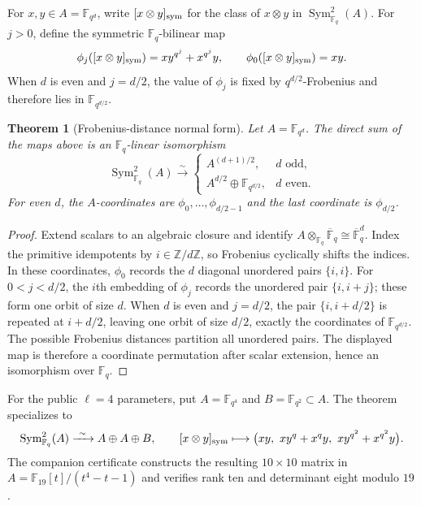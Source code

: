 \documentclass[11pt]{article}
\newtheorem{theorem}{Theorem}
\newcommand{\F}{\mathbb F}
\newcommand{\Sym}{\operatorname{Sym}}
\begin{document}
For $x,y\in A=\F_{q^d}$, write $[x\otimes y]_{\rm sym}$ for the class of
$x\otimes y$ in $\Sym^2_{\F_q}(A)$.  For $j>0$, define the symmetric
$\F_q$-bilinear map
\[
 \phi_j([x\otimes y]_{\rm sym})
 =xy^{q^j}+x^{q^j}y,
 \qquad
 \phi_0([x\otimes y]_{\rm sym})=xy.
\]
When $d$ is even and $j=d/2$, the value of $\phi_j$ is fixed by
$q^{d/2}$-Frobenius and therefore lies in $\F_{q^{d/2}}$.

\begin{theorem}[Frobenius-distance normal form]
\label{thm:frobenius-normal-form}
Let $A=\F_{q^d}$.  The direct sum of the maps above is an $\F_q$-linear
isomorphism
\[
 \Sym^2_{\F_q}(A)\xrightarrow{\ \sim\ }
 \begin{cases}
   A^{(d+1)/2}, & d\text{ odd},\\[2mm]
   A^{d/2}\oplus\F_{q^{d/2}}, & d\text{ even}.
 \end{cases}
\]
For even $d$, the $A$-coordinates are $\phi_0,\ldots,\phi_{d/2-1}$ and the
last coordinate is $\phi_{d/2}$.
\end{theorem}

\begin{proof}
Extend scalars to an algebraic closure and identify
$A\otimes_{\F_q}\overline{\F}_q\cong\overline{\F}_q^d$.  Index the primitive
idempotents by $i\in\mathbb Z/d\mathbb Z$, so Frobenius cyclically shifts the
indices.  In these coordinates, $\phi_0$ records the $d$ diagonal unordered
pairs $\{i,i\}$.  For $0<j<d/2$, the $i$th embedding of $\phi_j$ records the
unordered pair $\{i,i+j\}$; these form one orbit of size $d$.  When $d$ is
even and $j=d/2$, the pair $\{i,i+d/2\}$ is repeated at $i+d/2$, leaving one
orbit of size $d/2$, exactly the coordinates of $\F_{q^{d/2}}$.  The possible
Frobenius distances partition all unordered pairs.  The displayed map is
therefore a coordinate permutation after scalar extension, hence an
isomorphism over $\F_q$.
\end{proof}

For the public $\ell=4$ parameters, put $A=\F_{q^4}$ and
$B=\F_{q^2}\subset A$.  The theorem specializes to
\begin{equation}
\label{eq:frobenius-channel-isomorphism}
 \Sym^2_{\F_q}(A)\xrightarrow{\ \sim\ }A\oplus A\oplus B,
 \qquad
 [x\otimes y]_{\rm sym}\longmapsto
 \bigl(xy,\ xy^q+x^qy,\ xy^{q^2}+x^{q^2}y\bigr).
\end{equation}
The companion certificate constructs the resulting $10\times10$ matrix in
$A=\F_{19}[t]/(t^4-t-1)$ and verifies rank ten and determinant eight modulo
$19$.
\end{document}
